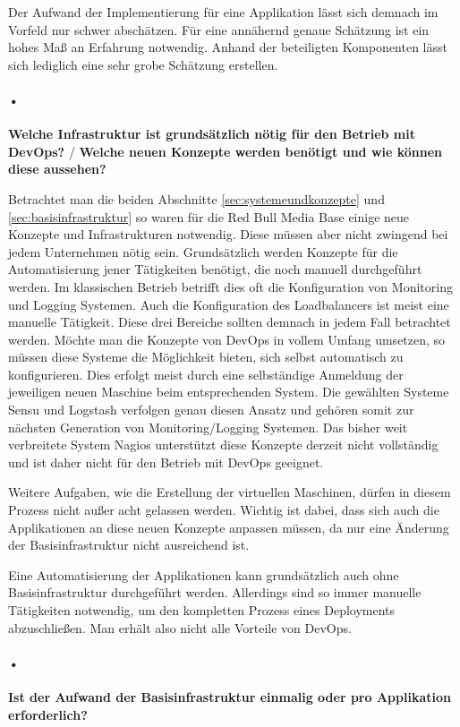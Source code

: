 Der Aufwand der Implementierung für eine Applikation lässt sich demnach im Vorfeld nur schwer abschätzen. Für eine annähernd genaue Schätzung ist ein hohes Maß an Erfahrung notwendig. Anhand der beteiligten Komponenten lässt sich lediglich eine sehr grobe Schätzung erstellen.

\paragraph{•} 
\textbf{Welche Infrastruktur ist grundsätzlich nötig für den Betrieb mit DevOps?} / \textbf{Welche neuen Konzepte werden benötigt und wie können diese aussehen?}

Betrachtet man die beiden Abschnitte \ref{sec:systemeundkonzepte} und \ref{sec:basisinfrastruktur} so waren für die Red Bull Media Base einige neue Konzepte und Infrastrukturen notwendig. Diese müssen aber nicht zwingend bei jedem Unternehmen nötig sein. Grundsätzlich werden Konzepte für die Automatisierung jener Tätigkeiten benötigt, die noch manuell durchgeführt werden. Im klassischen Betrieb betrifft dies oft die Konfiguration von Monitoring und Logging Systemen. Auch die Konfiguration des Loadbalancers ist meist eine manuelle Tätigkeit. Diese drei Bereiche sollten demnach in jedem Fall betrachtet werden. Möchte man die Konzepte von DevOps in vollem Umfang umsetzen, so müssen diese Systeme die Möglichkeit bieten, sich selbst automatisch zu konfigurieren. Dies erfolgt meist durch eine selbständige Anmeldung der jeweiligen neuen Maschine beim entsprechenden System. Die gewählten Systeme Sensu und Logstash verfolgen genau diesen Ansatz und gehören somit zur nächsten Generation von Monitoring/Logging Systemen. Das bisher weit verbreitete System Nagios unterstützt diese Konzepte derzeit nicht vollständig und ist daher nicht für den Betrieb mit DevOps geeignet.

Weitere Aufgaben, wie die Erstellung der virtuellen Maschinen, dürfen in diesem Prozess nicht außer acht gelassen werden. Wichtig ist dabei, dass sich auch die Applikationen an diese neuen Konzepte anpassen müssen, da nur eine Änderung der Basisinfrastruktur nicht ausreichend ist.

Eine Automatisierung der Applikationen kann grundsätzlich auch ohne Basisinfrastruktur durchgeführt werden. Allerdings sind so immer manuelle Tätigkeiten notwendig, um den kompletten Prozess eines Deployments abzuschließen. Man erhält also nicht alle Vorteile von DevOps.


\paragraph{•}
\textbf{Ist der Aufwand der Basisinfrastruktur einmalig oder pro Applikation erforderlich?}	


